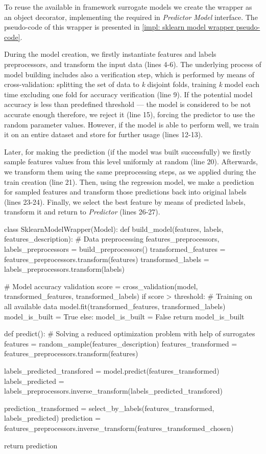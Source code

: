 To reuse the available in framework surrogate models we create the wrapper as an object decorator, implementing the required in \emph{Predictor} \emph{Model} interface. The pseudo-code of this wrapper is presented in \cref{impl: sklearn model wrapper pseudo-code}.

During the model creation, we firstly instantiate features and labels preprocessors, and transform the input data (lines 4-6). The underlying process of model building includes also a verification step, which is performed by means of cross-validation: splitting the set of data to \textit{k} disjoint folds, training \textit{k} model each time excluding one fold for accuracy verification (line 9). If the potential model accuracy is less than predefined threshold — the model is considered to be not accurate enough therefore, we reject it (line 15), forcing the predictor to use the random parameter values. However, if the model is able to perform well, we train it on an entire dataset and store for further usage (lines 12-13).

Later, for making the prediction (if the model was built successfully) we firstly sample features values from this level uniformly at random (line 20). Afterwards, we transform them using the same preprocessing steps, as we applied during the train creation (line 21). Then, using the regression model, we make a prediction for sampled features and transform those predictions back into original labels (lines 23-24). Finally, we select the best feature by means of predicted labels, transform it and return to \emph{Predictor} (lines 26-27).

\begin{code}[language=Python, caption=Scikit-learn linear model wrapper pseudo-code., label=impl: sklearn model wrapper pseudo-code]
class SklearnModelWrapper(Model):
	def build_model(features, labels, features_description):
		# Data preprocessing
		features_preprocessors, labels_preprocessors = build_preprocessors()
		transformed_features = features_preprocessors.transform(features)
	 	transformed_labels = labels_preprocessors.transform(labels)
	 	
	 	# Model accuracy validation
	 	score = cross_validation(model, transformed_features, transformed_labels)
	 	if score > threshold:
	 		# Training on all available data
	 		model.fit(transformed_features, transformed_labels)
	 		model_is_built = True
	 	else:
	 		model_is_built = False
	 	return model_is_built
	 
	 def predict():
	 	# Solving a reduced optimization problem with help of surrogates
	 	features = random_sample(features_description)
	 	features_transformed = features_preprocessors.transform(features)
	 	
	 	labels_predicted_transfored = model.predict(features_transformed)
	 	labels_predicted = labels_preprocessors.inverse_transform(labels_predicted_transfored)
	 	
	 	prediction_transformed = select_by_labels(features_transformed, labels_predicted)
	 	prediction = features_preprocessors.inverse_transform(features_transformed_chosen)
	 	
		return prediction
\end{code}

